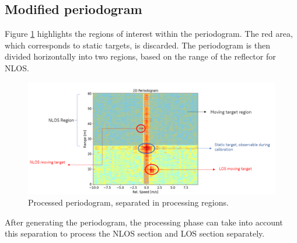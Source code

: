 	\subsection{Modified periodogram}
	
	Figure \ref{fig:Rad_nlos_los_separation} highlights the regions of interest within the periodogram.
	The red area, which corresponds to static targets, is discarded. The periodogram is then divided horizontally into two regions, based on the range of the reflector for NLOS.
	
	\begin{figure}[H]
		\centering
		\includegraphics[width=1.1\textwidth]{Images/Test1/nlos-los-separation.png}
		\caption{Processed periodogram, separated in processing regions.}
		\label{fig:Rad_nlos_los_separation}
	\end{figure}
	
	
	After generating the periodogram, the processing phase can take into account this separation to process the NLOS section and LOS section separately.
	







